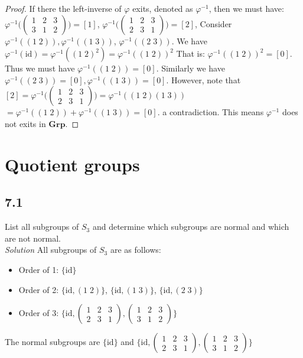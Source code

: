 \documentclass[a4paper, pdf, 12pt]{article}
\begin{document}
\begin{proof}
  If there the left-inverse of $\varphi$ exits, denoted as $\varphi^{-1}$,
  then we must have: $\varphi^{-1}\biggl(\begin{pmatrix}
        1 & 2 & 3 \\
        3 & 1 & 2
      \end{pmatrix}\biggr) = [1]$,
  $\varphi^{-1}\biggl(\begin{pmatrix}
        1 & 2 & 3 \\
        2 & 3 & 1
      \end{pmatrix}\biggr) = [2]$,
  Consider $\varphi^{-1}((1\;2)), \varphi^{-1}((1\;3))$, $\varphi^{-1}((2\;3))$.
  We have $\varphi^{-1}(\mbox{id}) = \varphi^{-1}((1\;2)^{2}) = \varphi^{-1}((1\;2))^{2}$
  That is: $\varphi^{-1}((1\;2))^{2} = [0]$. Thus we must have $\varphi^{-1}((1\;2)) = [0]$.
  Similarly we have $\varphi^{-1}((2\;3)) = [0], \varphi^{-1}((1\;3)) = [0]$. However,
  note that $[2] = \varphi^{-1}\biggl(\begin{pmatrix}
        1 & 2 & 3 \\
        2 & 3 & 1
      \end{pmatrix}\biggr) = \varphi^{-1}((1\;2)(1\;3))$ $=\varphi^{-1}((1\;2)) + \varphi^{-1}((1\;3)) = [0]$.
  a contradiction. This means $\varphi^{-1}$ does not exits in $\textbf{Grp}$.
\end{proof}

\section{Quotient groups}
\subsection*{7.1} List all subgroups of $S_3$ and determine which subgroups are normal and which
are not normal.\\
\noindent
\textit{Solution} \quad All subgroups of $S_{3}$ are as follows:
\begin{itemize}
  \item Order of 1: $\{\mbox{id}\}$
  \item Order of 2: $\{\mbox{id}, (1\;2)\}$, $\{\mbox{id}, (1\;3)\}$, $\{\mbox{id}, (2\;3)\}$
  \item Order of 3: $\biggl\{\mbox{id}, \begin{pmatrix}
            1 & 2 & 3 \\
            2 & 3 & 1
          \end{pmatrix},
          \begin{pmatrix}
            1 & 2 & 3 \\
            3 & 1 & 2
          \end{pmatrix}
          \biggr\}
        $
\end{itemize}
The normal subgroups are $\{\mbox{id}\}$ and $\biggl\{
  \mbox{id},
  \begin{pmatrix}
    1 & 2 & 3\\
    2 & 3 & 1
  \end{pmatrix},
  \begin{pmatrix}
    1 & 2 & 3\\
    3 & 1 & 2
  \end{pmatrix}
\biggr\}$
\end{document}
